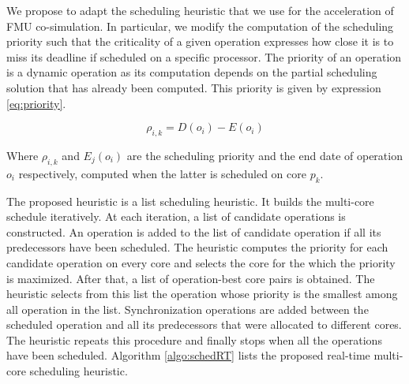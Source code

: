 We propose to adapt the scheduling heuristic that we use for the acceleration of FMU co-simulation. In particular, we modify the computation of the scheduling priority such that the criticality of a given operation expresses how close it is to miss its deadline if scheduled on a specific processor. The priority of an operation is a dynamic operation as its computation depends on the partial scheduling solution that has already been computed. This priority is given by expression \ref{eq:priority}.

\begin{equation}
\rho_{i,k} = D(o_i) - E(o_i)
\label{eq:priority}
\end{equation}

Where $\rho_{i,k}$ and $E_j(o_i)$ are the scheduling priority and the end date of operation $o_i$ respectively, computed when the latter is scheduled on core $p_k$.

The proposed heuristic is a list scheduling heuristic. It builds the multi-core schedule iteratively. At each iteration, a list of candidate operations is constructed. An operation is added to the list of candidate operation if all its predecessors have been scheduled. The heuristic computes the priority for each candidate operation on every core and selects the core for the which the priority is maximized. After that, a list of operation-best core pairs is obtained. The heuristic selects from this list the operation whose priority is the smallest among all operation in the list. Synchronization operations are added between the scheduled operation and all its predecessors that were allocated to different cores. The heuristic repeats this procedure and finally stops when all the operations have been scheduled. Algorithm \ref{algo:schedRT} lists the proposed real-time multi-core scheduling heuristic. 

